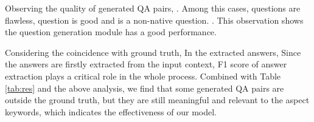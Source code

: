 
Observing the quality of generated QA pairs, .
Among this cases, questions  are flawless, question  is good and  is a non-native question.
.
This observation shows the question generation module has a good performance.
 
Considering the coincidence with ground truth,
In the  extracted answers, 
Since the answers are firstly extracted from the input context, F1 score of answer extraction plays a critical role in the whole process.
Combined with Table \ref{tab:res} and the above analysis, 
we find that some generated QA pairs are outside the ground truth, but they are still meaningful and relevant to the aspect keywords,
which indicates the effectiveness of our model.

